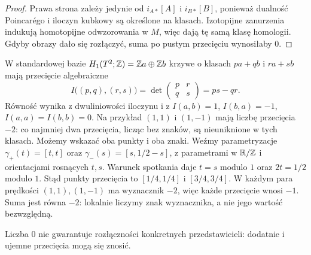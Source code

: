 \begin{proof}
Prawa strona zależy jedynie
od $i_{A*}[A]$ i $i_{B*}[B]$,
ponieważ dualność Poincarégo
i iloczyn kubkowy są
określone na klasach.
Izotopijne zanurzenia
indukują homotopijne
odwzorowania w $M$,
więc dają tę samą
klasę homologii.
Gdyby obrazy dało się
rozłączyć, suma po
pustym przecięciu
wynosiłaby $0$.
\end{proof}

\begin{przyklad}
\label{prz:przeciecia-krzywych-torus-21}
W standardowej bazie
$H_1(T^2;\mathbb{Z})=\mathbb{Z} a\oplus\mathbb{Z} b$
krzywe o klasach
$pa+qb$ i $ra+sb$
mają przecięcie algebraiczne
\[
 I\bigl((p,q),(r,s)\bigr)
 =\det\begin{pmatrix}p&r\\q&s\end{pmatrix}
 =ps-qr.
\]
Równość wynika z dwuliniowości
iloczynu i z
$I(a,b)=1$, $I(b,a)=-1$,
$I(a,a)=I(b,b)=0$.
Na przykład $(1,1)$ i $(1,-1)$
mają liczbę przecięcia $-2$:
co najmniej dwa przecięcia,
licząc bez znaków, są
nieuniknione w tych klasach.
Możemy wskazać oba punkty i oba znaki.
Weźmy parametryzacje
$\gamma_+(t)=[t,t]$ oraz
$\gamma_-(s)=[s,1/2-s]$, z parametrami w $\mathbb{R}/\mathbb{Z}$
i orientacjami rosnących $t,s$.
Warunek spotkania daje $t=s$ modulo $1$ oraz
$2t=1/2$ modulo $1$. Stąd punkty przecięcia to
$[1/4,1/4]$ i $[3/4,3/4]$.
W każdym para prędkości $(1,1),(1,-1)$
ma wyznacznik $-2$, więc każde przecięcie wnosi $-1$.
Suma jest równa $-2$: lokalnie liczymy znak wyznacznika,
a nie jego wartość bezwzględną.

\begin{center}
\end{center}
Liczba $0$ nie gwarantuje
rozłączności konkretnych
przedstawicieli: dodatnie
i ujemne przecięcia mogą
się znosić.
\end{przyklad}

